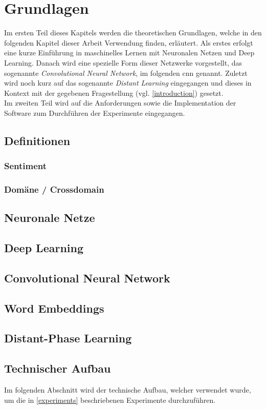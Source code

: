 \chapter{Grundlagen}
Im ersten Teil dieses Kapitels werden die theoretischen Grundlagen, welche in den folgenden Kapitel dieser Arbeit Verwendung finden, erläutert. Als erstes erfolgt eine kurze Einführung in maschinelles Lernen mit Neuronalen Netzen und Deep Learning. Danach wird eine spezielle Form dieser Netzwerke vorgestellt, das sogenannte \emph{Convolutional Neural Network}, im folgenden \gls{cnn} genannt. Zuletzt wird noch kurz auf das sogenannte \emph{Distant Learning} \cite{deriu2016sentiment} eingegangen und dieses in Kontext mit der gegebenen Fragestellung (vgl. \ref{introduction}) gesetzt.\\
Im zweiten Teil wird auf die Anforderungen sowie die Implementation der Software zum Durchführen der Experimente eingegangen.

\section{Definitionen}
\subsection{Sentiment}
\blindtext
\subsection{Domäne / Crossdomain}
\blindtext
\section{Neuronale Netze}
\blindtext
\section{Deep Learning}
\blindtext
\section{Convolutional Neural Network}
\blindtext
\section{Word Embeddings}
\blindtext
\section{Distant-Phase Learning}
\blindtext
\section{Technischer Aufbau}
Im folgenden Abschnitt wird der technische Aufbau, welcher verwendet wurde, um die in \ref{experiments} beschriebenen Experimente durchzuführen.
